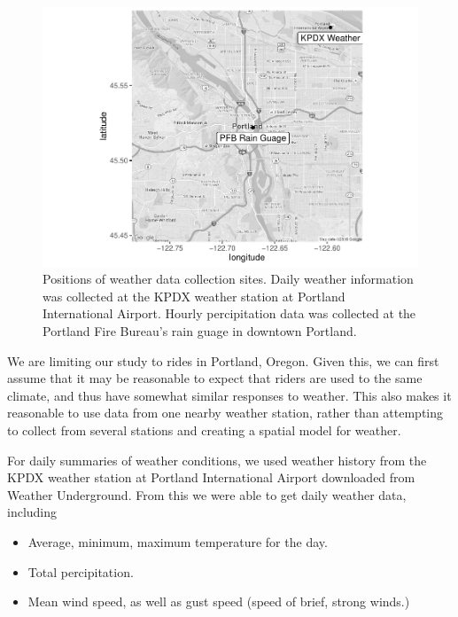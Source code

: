 \documentclass[12pt,twoside]{reedthesis}
\providecommand{\tightlist}{%
  \setlength{\itemsep}{0pt}\setlength{\parskip}{0pt}}
\begin{document}
  \begin{figure}[tbh]
  \centering
  \includegraphics[angle = 0,scale = 1]{figure/weather_station_map.pdf}
  \caption[Positions of weather data collection sites. Daily weather information
  was collected at the KPDX weather station at Portland International Airport. 
  Hourly percipitation data was collected at the Portland Fire Bureau's rain
  guage in downtown Portland.]{\normalsize{Positions of weather data collection sites. Daily weather information
  was collected at the KPDX weather station at Portland International Airport. 
  Hourly percipitation data was collected at the Portland Fire Bureau's rain
  guage in downtown Portland.}}
  \label{fig:weather-stations}
  \end{figure}
  
  We are limiting our study to rides in Portland, Oregon. Given this, we
  can first assume that it may be reasonable to expect that riders are
  used to the same climate, and thus have somewhat similar responses to
  weather. This also makes it reasonable to use data from one nearby
  weather station, rather than attempting to collect from several stations
  and creating a spatial model for weather.
  
  For daily summaries of weather conditions, we used weather history from
  the KPDX weather station at Portland International Airport downloaded
  from Weather Underground. From this we were able to get daily weather
  data, including
  
  \begin{itemize}
  \tightlist
  \item
    Average, minimum, maximum temperature for the day.
  \item
    Total percipitation.
  \item
    Mean wind speed, as well as gust speed (speed of brief, strong winds.)
  \end{itemize}
  
\end{document}
